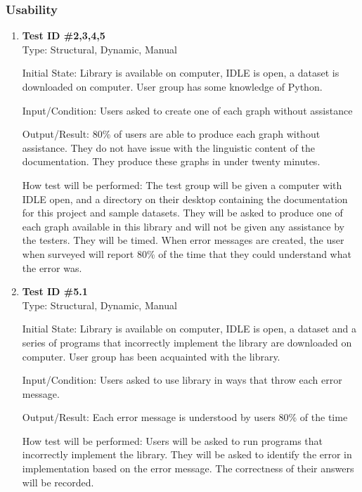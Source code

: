 \documentclass[12pt, titlepage]{article}
\begin{document}
\subsubsection{Usability}
\begin{enumerate}
\item{\textbf{Test ID \#2,3,4,5\\}}
Type: Structural, Dynamic, Manual
					
Initial State:  Library is available on computer, IDLE is open, a dataset is downloaded on computer. User group has some knowledge of Python.
					
Input/Condition: Users asked to create one of each graph without assistance
					
Output/Result: 80\% of users are able to produce each graph without assistance. They do not have issue with the linguistic content of the documentation. They produce these graphs in under twenty minutes.
					
How test will be performed: The test group will be given a computer with IDLE open, and a directory on their desktop containing the documentation for this project and sample datasets. They will be asked to produce one of each graph available in this library and will not be given any assistance by the testers. They will be timed. When error messages are created, the user when surveyed will report 80\% of the time that they could understand what the error was.
		
\item{\textbf{Test ID \#5.1\\}}
Type: Structural, Dynamic, Manual
					
Initial State:    Library is available on computer, IDLE is open, a dataset and a series of programs that incorrectly implement the library are downloaded on computer. User group has been acquainted with the library.
					
Input/Condition: Users asked to use library in ways that throw each error message.
					
Output/Result: Each error message is understood by users 80\% of the time
					
How test will be performed: Users will be asked to run programs that incorrectly implement the library. They will be asked to identify the error in implementation based on the error message. The correctness of their answers will be recorded.

 \end{enumerate} 
 
\end{document}
